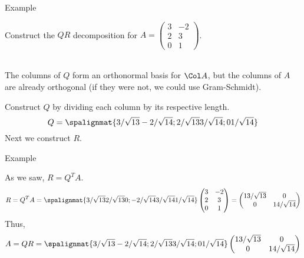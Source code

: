 \begin{frame}{Example} 

    Construct the $ QR$ decomposition for $A = \begin{pmatrix}
        3 & -2  \\ 2 & 3  \\ 0 & 1 
        \end{pmatrix}$.
    \pause
    
    \\
    The columns of $Q$ form an orthonormal basis for $\Col A$, but the columns of $A$ are already orthogonal (if they were not, we could use Gram-Schmidt). 
    
    \vspace{12pt}
    \pause 
    Construct $Q$ by dividing each column by its respective length. 
    $$Q = \spalignmat{3/\sqrt{13} -2/\sqrt{14};2/\sqrt{13} 3/\sqrt{14};0 1/\sqrt{14}}$$
    Next we construct $R$. 
    
\end{frame}

\begin{frame}{Example} 

    As we saw, $R = Q^TA$. \pause 
    $$R = Q^TA = \spalignmat{3/\sqrt{13} 2/\sqrt{13} 0 ;-2/\sqrt{14} 3/\sqrt{14} 1/\sqrt{14}} \begin{pmatrix}
        3 & -2  \\ 2 & 3  \\ 0 & 1 
    \end{pmatrix} = \begin{pmatrix} 13/\sqrt{13} & 0\\0 &14/\sqrt{14}\end{pmatrix}$$
    \pause 
    Thus, 
    $$A = QR = \spalignmat{3/\sqrt{13} -2/\sqrt{14};2/\sqrt{13} 3/\sqrt{14};0 1/\sqrt{14}} \begin{pmatrix} 13/\sqrt{13} & 0\\0 &14/\sqrt{14}\end{pmatrix} $$
\end{frame}






